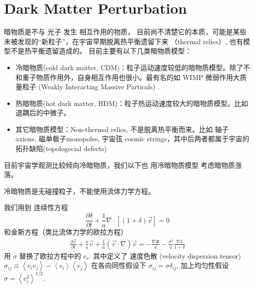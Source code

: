 \documentclass[12pt]{ctexart}
\begin{document}



\section{Dark Matter Perturbation}

暗物质是不与 光子 发生 相互作用的物质，
目前尚不清楚它的本质，可能是某些未被发现的“新粒子”，在宇宙早期脱离热平衡遗留下来 （thermal relics）,
也有模型不是热平衡遗留造成的。
目前主要有以下几类暗物质模型：
\begin{itemize}
    \item 冷暗物质(cold dark matter, CDM)：粒子运动速度较低的暗物质模型。除了不和重子物质作用外，自身相互作用也很小。最有名的如 WIMP 微弱作用大质量粒子 (Weakly Interacting Massive Particals) .
    \item 热暗物质(hot dark matter, HDM)：粒子热运动速度较大的暗物质模型。比如退耦后的中微子。
    \item 其它暗物质模型：Non-thermal relics, 不是脱离热平衡而来。比如 轴子 axions, 磁单极子monopoles, 宇宙弦 cosmic strings，其中后两者都属于宇宙的拓扑缺陷(topologecial defects)
\end{itemize}

目前宇宙学观测比较倾向冷暗物质，我们以下也 用冷暗物质模型 考虑暗物质涨落。

冷暗物质是无碰撞粒子，不能使用流体力学方程。

我们用到
连续性方程
\begin{equation}
    \frac{\partial \delta}{\partial t}+\frac{1}{a} \nabla \cdot[(1+\delta) \vec{v}]=0
\end{equation}
和金斯方程（类比流体力学的欧拉方程）
\begin{eqnarray}
    \frac{\partial \vec{v}}{\partial t}+\frac{\dot{a}}{a} \vec{v}+\frac{1}{a}(\vec{v} \cdot \nabla) \vec{v} =-\frac{\nabla \Phi}{a} - \frac{\sigma^2}{a}\frac{\nabla \delta}{1+\delta}
\end{eqnarray}
用 $\sigma$ 替换了欧拉方程中的 $c_s$.
其中定义了 速度色散 (velocity dispersion tensor)
$\sigma_{ij} \equiv\left\langle v_{i} v_{j}\right\rangle-\left\langle v_{i}\right\rangle\left\langle v_{j}\right\rangle$
在各向同性假设下 $\sigma_{ij}=\sigma\delta_{ij}$,
加上均匀性假设 $\sigma=\left\langle v_i^2 \right\rangle ^{1/2}$.
\end{document}
